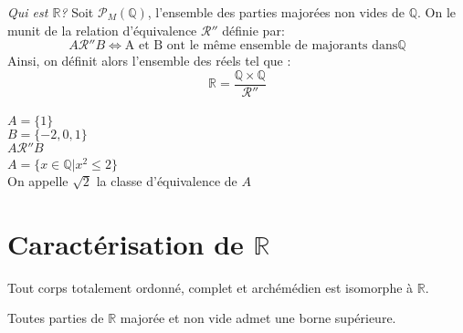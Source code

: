 \documentclass[../main.tex]{subfile}
\begin{document}
\emph{Qui est $\mathbb{R}$?}
Soit $\mathcal{P}_M(\mathbb{Q})$, l'ensemble des parties majorées non vides de $\mathbb{Q}$. 
On le munit de la relation d'équivalence $\mathcal{R}''$ définie par:
$$A \mathcal{R}'' B \Leftrightarrow \text{A et B ont le même ensemble de majorants dans} \mathbb{Q}$$
Ainsi, on définit alors l'ensemble des réels tel que :
$$\mathbb{R} = \frac{\mathbb{Q} \times \mathbb{Q}}{\mathcal{R}''}$$

\begin{ex}
	$\phantom{a}$\\
	$A = \{1\}$\\
	$B = \{-2, 0, 1\}$\\
	$A \mathcal{R}'' B$\\
	$$\phantom{a}$$
	$A= \{x \in \mathbb{Q} | x^2 \leq 2\}$\\
	On appelle $\sqrt{2}$ la classe d'équivalence de $A$
\end{ex}

\section{Caractérisation de $\mathbb{R}$}

\begin{theo}
	Tout corps totalement ordonné, complet et archémédien est isomorphe à $\mathbb{R}$.
\end{theo}

\begin{theo}
	Toutes parties de $\mathbb{R}$ majorée et non vide admet une borne supérieure.
\end{theo}
\end{document}
